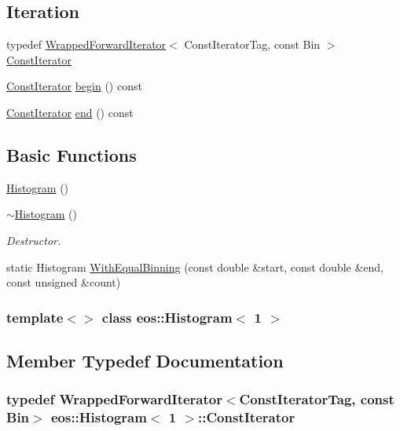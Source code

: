 \subsection*{Iteration}
\label{_amgrp86c1e32c05338b57578313d8a6fa892d}
 \begin{DoxyCompactItemize}
\item 
typedef \hyperlink{classeos_1_1WrappedForwardIterator}{WrappedForwardIterator}$<$ ConstIteratorTag, const Bin $>$ \hyperlink{classeos_1_1Histogram_3_011_01_4_a58a52ac9f83f5712f4cab9d385660e50}{ConstIterator}
\item 
\hyperlink{classeos_1_1WrappedForwardIterator}{ConstIterator} \hyperlink{classeos_1_1Histogram_3_011_01_4_a76e195e3ddf0422c9fa0d898f422b49b}{begin} () const 
\item 
\hyperlink{classeos_1_1WrappedForwardIterator}{ConstIterator} \hyperlink{classeos_1_1Histogram_3_011_01_4_a973197d530ad51adc4f09bce519a5add}{end} () const 
\end{DoxyCompactItemize}
\subsection*{Basic Functions}
\label{_amgrp2386c9a1f1785edee33f374dd2db9b3d}
 \begin{DoxyCompactItemize}
\item 
\hyperlink{classeos_1_1Histogram_3_011_01_4_a474cfef8ca45667e839aea82cbccc75b}{Histogram} ()
\item 
\hyperlink{classeos_1_1Histogram_3_011_01_4_ae1c6c89b704ae90ca03fff94124d3124}{$\sim$Histogram} ()
\begin{DoxyCompactList}\small\item\em Destructor. \item\end{DoxyCompactList}\item 
static Histogram \hyperlink{classeos_1_1Histogram_3_011_01_4_a06afb7c9698cce0065d220d4a6b8f0e3}{WithEqualBinning} (const double \&start, const double \&end, const unsigned \&count)
\end{DoxyCompactItemize}
\subsubsection*{template$<$$>$ class eos::Histogram$<$ 1 $>$}



\subsection{Member Typedef Documentation}
\hypertarget{classeos_1_1Histogram_3_011_01_4_a58a52ac9f83f5712f4cab9d385660e50}{
\subsubsection[{ConstIterator}]{\setlength{\rightskip}{0pt plus 5cm}typedef {\bf WrappedForwardIterator}$<$ConstIteratorTag, const Bin$>$ eos::Histogram$<$ 1 $>$::{\bf ConstIterator}}}
\label{classeos_1_1Histogram_3_011_01_4_a58a52ac9f83f5712f4cab9d385660e50}


